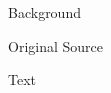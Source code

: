 				\begin{description}
					\item[Background]
				\end{description}
				
					\phantom{.}
				
				\begin{description}
					\item[Original Source]
				\end{description}
				
					\phantom{.}
				
				\begin{description}
					\item[Text]
				\end{description}
					
					\phantom{.}
			
\pagebreak{}
